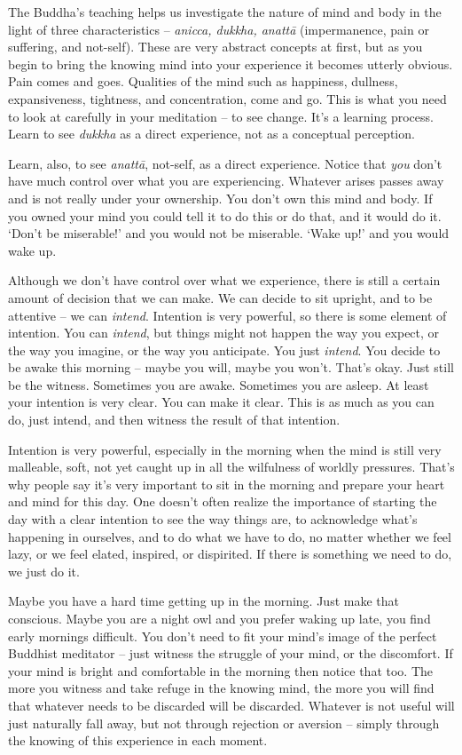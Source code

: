 The Buddha's teaching helps us investigate the nature of mind and body in the light of three characteristics -- \textit{anicca, dukkha, anatt\=a} (impermanence, pain or suffering, and not-self). These are very abstract concepts at first, but as you begin to bring the knowing mind into your experience it becomes utterly obvious. Pain comes and goes. Qualities of the mind such as happiness, dullness, expansiveness, tightness, and concentration, come and go. This is what you need to look at carefully in your meditation -- to see change. It's a learning process. Learn to see \textit{dukkha} as a direct experience, not as a conceptual perception.

Learn, also, to see \textit{anatt\=a}, not-self, as a direct experience. Notice that \textit{you} don't have much control over what you are experiencing. Whatever arises passes away and is not really under your ownership. You don't own this mind and body. If you owned your mind you could tell it to do this or do that, and it would do it. `Don't be miserable!' and you would not be miserable. `Wake up!' and you would wake up.

Although we don't have control over what we experience, there is still a certain amount of decision that we can make. We can decide to sit upright, and to be attentive -- we can \textit{intend}. Intention is very powerful, so there is some element of intention. You can \textit{intend}, but things might not happen the way you expect, or the way you imagine, or the way you anticipate. You just \textit{intend}. You decide to be awake this morning -- maybe you will, maybe you won't. That's okay. Just still be the witness. Sometimes you are awake. Sometimes you are asleep. At least your intention is very clear. You can make it clear. This is as much as you can do, just intend, and then witness the result of that intention.

Intention is very powerful, especially in the morning when the mind is still very malleable, soft, not yet caught up in all the wilfulness of worldly pressures. That's why people say it's very important to sit in the morning and prepare your heart and mind for this day. One doesn't often realize the importance of starting the day with a clear intention to see the way things are, to acknowledge what's happening in ourselves, and to do what we have to do, no matter whether we feel lazy, or we feel elated, inspired, or dispirited. If there is something we need to do, we just do it. 

Maybe you have a hard time getting up in the morning. Just make that conscious. Maybe you are a night owl and you prefer waking up late, you find early mornings difficult. You don't need to fit your mind's image of the perfect Buddhist meditator -- just witness the struggle of your mind, or the discomfort. If your mind is bright and comfortable in the morning then notice that too. The more you witness and take refuge in the knowing mind, the more you will find that whatever needs to be discarded will be discarded. Whatever is not useful will just naturally fall away, but not through rejection or aversion -- simply through the knowing of this experience in each moment. 

